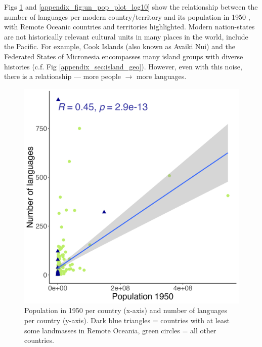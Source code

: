 \documentclass[12pt,letterpaper]{article}
\begin{document}
Figs \ref{appendix_fig:un_pop_plot} and \ref{appendix_fig:un_pop_plot_log10} show the relationship between the number of languages per modern country/territory \citep{glottolog3} and its population in 1950 \citep{UN_pop}, with Remote Oceanic countries and territories highlighted. Modern nation-states are not historically relevant cultural units in many places in the world, include the Pacific. For example, Cook Islands (also known as Avaiki Nui) and the Federated States of Micronesia encompasses many island groups with diverse histories (c.f. Fig \ref{appendix_sec:island_geo}). However, even with this noise, there is a relationship --- more people $\rightarrow$ more languages.

\begin{figure}[ht]
    \centering
    \includegraphics[width=.7\textwidth]{number_of_languages_vs_pop_1950}
    \caption{Population in 1950 per country (x-axis) and number of languages per country (y-axis). Dark blue triangles = countries with at least some landmasses in Remote Oceania, green circles = all other countries.}
        \label{appendix_fig:un_pop_plot}
    \end{figure}
    
\end{document}

